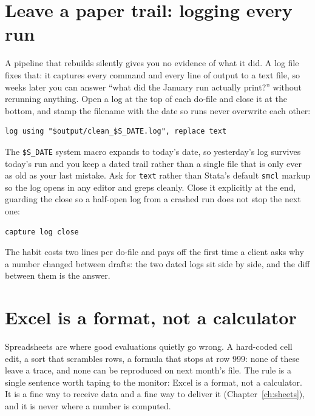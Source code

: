 \documentclass[
    a4paper,
    fontsize=10pt,
    twoside=true,
    numbers=noenddot,
]{kaobook}
\begin{document}
\section{Leave a paper trail: logging every run}\label{sec:logging}
A pipeline that rebuilds silently gives you no evidence of what it did. A log file fixes that: it captures every command and every line of output to a text file, so weeks later you can answer \enquote{what did the January run actually print?} without rerunning anything. Open a log at the top of each do-file and close it at the bottom, and stamp the filename with the date so runs never overwrite each other:
{\footnotesize
\begin{verbatim}
log using "$output/clean_$S_DATE.log", replace text
\end{verbatim}
}
The \texttt{\$S\_DATE} system macro expands to today's date, so yesterday's log survives today's run and you keep a dated trail rather than a single file that is only ever as old as your last mistake. Ask for \texttt{text} rather than Stata's default \texttt{smcl} markup so the log opens in any editor and greps cleanly. Close it explicitly at the end, guarding the close so a half-open log from a crashed run does not stop the next one:
{\footnotesize
\begin{verbatim}
capture log close
\end{verbatim}
}
The habit costs two lines per do-file and pays off the first time a client asks why a number changed between drafts: the two dated logs sit side by side, and the diff between them is the answer.

\section{Excel is a format, not a calculator}
Spreadsheets are where good evaluations quietly go wrong. A hard-coded cell edit, a sort that scrambles rows, a formula that stops at row 999: none of these leave a trace, and none can be reproduced on next month's file. The rule is a single sentence worth taping to the monitor: Excel is a format, not a calculator. It is a fine way to receive data and a fine way to deliver it (Chapter~\ref{ch:sheets}), and it is never where a number is computed.
\end{document}
